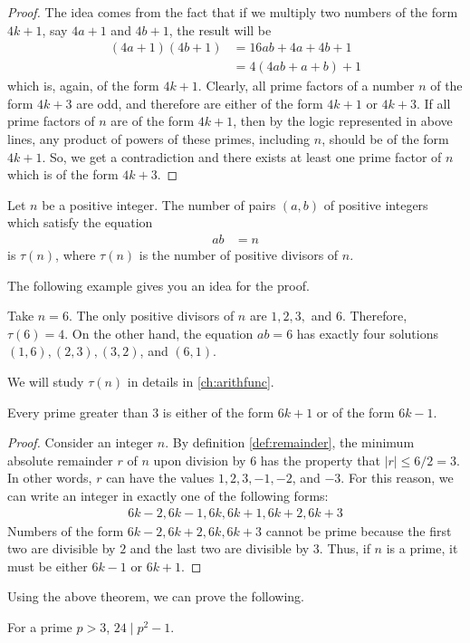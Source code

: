 \begin{proof}
	The idea comes from the fact that if we multiply two numbers of the form $4k+1$, say $4a+1$ and $4b+1$, the result will be
	\begin{align*}
		(4a+1)(4b+1)
			& =16ab+4a+4b+1\\
			& =4(4ab+a+b)+1
	\end{align*}
	which is, again, of the form $4k+1$. Clearly, all prime factors of a number $n$ of the form $4k+3$ are odd, and therefore are either of the form $4k+1$ or $4k+3$. If all prime factors of $n$ are of the form $4k+1$, then by the logic represented in above lines, any product of powers of these primes, including $n$, should be of the form $4k+1$. So, we get a contradiction and there exists at least one prime factor of $n$ which is of the form $4k+3$.
\end{proof}
\begin{theorem}\label{thm:nos}
	Let $n$ be a positive integer. The number of pairs $(a,b)$ of positive integers which satisfy the equation
	\begin{align*}
		ab & = n
	\end{align*}
	is $\tau(n)$, where $\tau(n)$ is the number of positive divisors of $n$.
\end{theorem}

The following example gives you an idea for the proof.

\begin{example}
	Take $n=6$. The only positive divisors of $n$ are $1,2,3,$ and $6$. Therefore, $\tau(6)=4$. On the other hand, the equation $ab=6$ has exactly four solutions $(1,6), (2,3),(3,2)$, and $(6,1)$.
\end{example}

We will study $\tau(n)$ in details in \autoref{ch:arithfunc}.

\begin{theorem}
	Every prime greater than $3$ is either of the form $6k+1$ or of the form $6k-1$.
\end{theorem}

\begin{proof}
	Consider an integer $n$. By definition \eqref{def:remainder}, the minimum absolute remainder $r$ of $n$ upon division by $6$ has the property that $|r| \leq 6/2=3$. In other words, $r$ can have the values $1,2,3,-1,-2$, and $-3$. For this reason, we can write an integer in exactly one of the following forms:
	\begin{align*}
		6k-2,6k-1,6k,6k+1,6k+2,6k+3
	\end{align*}
	Numbers of the form $6k-2, 6k+2, 6k, 6k+3$ cannot be prime because the first two are divisible by $2$ and the last two are divisible by $3$. Thus, if $n$ is a prime, it must be either $6k-1$ or $6k+1$.
\end{proof}
Using the above theorem, we can prove the following.
\begin{theorem}
	For a prime $p>3$, $24\mid p^2-1$.
\end{theorem}

